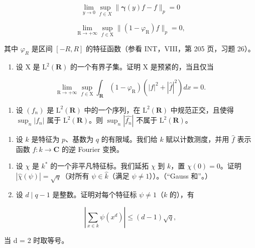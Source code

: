 \[
\lim _ {y \to 0} \sup _ {f \in X} \| \boldsymbol {\gamma} (y) f - f \| _ {p} = 0
\]

\[
\lim _ {\mathrm{R} \to + \infty} \sup _ {f \in \mathrm{X}} \| (1 - \varphi_ {\mathrm{R}}) f \| _ {p} = 0,
\]

其中 \(\varphi_{R}\) 是区间 \([-R,R]\) 的特征函数（参看 INT，VIII，第 205 页，习题 26）。

\begin{enumerate}
\def\labelenumi{\alph{enumi})}
\setcounter{enumi}{1}
\tightlist
\item
  设 X 是 \(\mathrm{L}^{2}(\mathbf{R})\) 的一个有界子集。证明 X 是预紧的，当且仅当
\end{enumerate}

\[
\lim _ {\mathrm{R} \to + \infty} \sup _ {f \in \mathrm{X}} \int_ {\mathbf {R}} (1 - \varphi_ {\mathrm{R}}) (| f | ^ {2} + | \widehat {f} | ^ {2}) d x = 0.
\]

\begin{enumerate}
\def\labelenumi{\alph{enumi})}
\setcounter{enumi}{2}
\tightlist
\item
  设 \((f_{n})\) 是 \(\mathrm{L}^{2}(\mathbf{R})\) 中的一个序列，在 \(\mathrm{L}^{2}(\mathbf{R})\) 中规范正交，且使得 \(\sup_{n}|f_{n}|\) 属于 \(\mathrm{L}^{2}(\mathbf{R})\)。则 \(\sup_{n}|\widehat{f_{n}}|\) 不属于 \(\mathrm{L}^{2}(\mathbf{R})\)。
\end{enumerate}

\begin{enumerate}
\def\labelenumi{\arabic{enumi})}
\setcounter{enumi}{48}
\tightlist
\item
  设 \(k\) 是特征为 \(p\)、基数为 \(q\) 的有限域。我们给 \(k\) 赋以计数测度，并用 \(\widehat{f}\) 表示函数 \(f: k \to \mathbf{C}\) 的逆 Fourier 变换。
\end{enumerate}

\begin{enumerate}
\def\labelenumi{\alph{enumi})}
\item
  设 \(\chi\) 是 \(k^{*}\) 的一个非平凡特征标。我们延拓 \(\chi\) 到 \(k\)，置 \(\chi(0) = 0\)。证明 \(|\widehat{\chi}(\psi)| = \sqrt{q}\)（对所有 \(\psi \in \widehat{k}\)（满足 \(\psi \neq 1\)））。（“Gauss 和”。）
\item
  设 \(d \mid q - 1\) 是整数。证明对每个特征标 \(\psi \neq 1\)（\(k\) 的），有
\end{enumerate}

\[
\left| \sum_ {x \in k} \psi (x ^ {d}) \right| \leqslant (d - 1) \sqrt {q},
\]

当 d = 2 时取等号。

